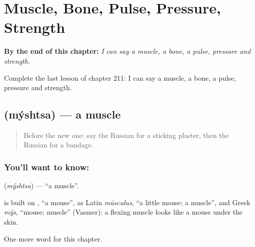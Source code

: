 
\chapter{Muscle, Bone, Pulse, Pressure, Strength}
\label{ch:ru-muscle-bone-pulse-pressure-strength}

\begin{chapteropening}
\textbf{By the end of this chapter:} \emph{I can say a muscle, a bone, a pulse, pressure and strength.}

Complete the last lesson of chapter 211: I can say a muscle, a bone, a pulse, pressure and strength.
\end{chapteropening}

\section[\texorpdfstring{\ru{мышца} (mýshtsa)}{мышца (mýshtsa)}]{ (mýshtsa) — a muscle}

\label{lesson:RU-C211-myshtsa}



\begin{quote}
Before the new one: say the Russian for a sticking plaster, then the Russian for a bandage.
\end{quote}

\subsection*{You'll want to know: }
\textbf{} (\emph{mýshtsa}) — \textquotedblleft{}a muscle\textquotedblright{}.

\begin{cousinweb}
\textbf{} is built on \emph{}, \textquotedblleft{}a mouse\textquotedblright{}, as Latin \emph{mūsculus}, \textquotedblleft{}a little mouse; a muscle\textquotedblright{}, and Greek \emph{mŷs}, \textquotedblleft{}mouse; muscle\textquotedblright{} (Vasmer): a flexing muscle looks like a mouse under the skin.
\end{cousinweb}

\begin{grammarlens}[title={What you've built}]
One more word for this chapter.
\end{grammarlens}

